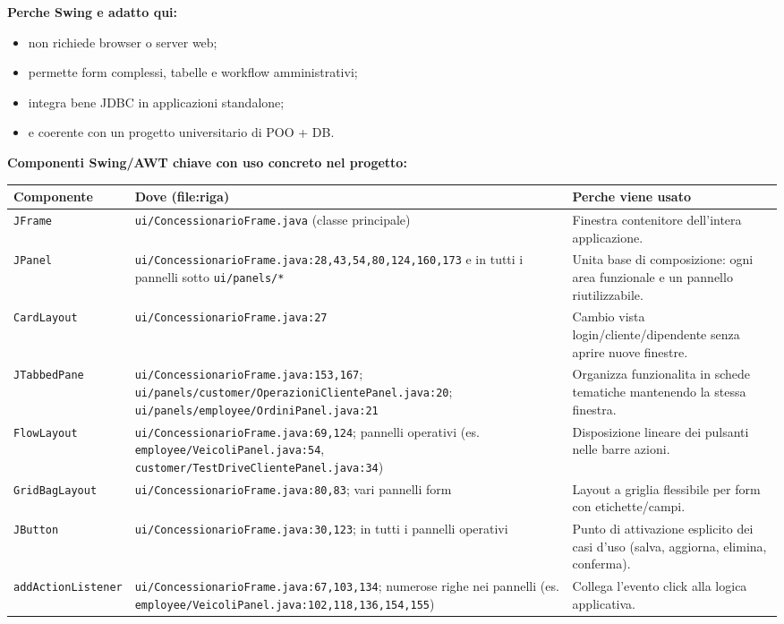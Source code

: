 \documentclass[12pt,a4paper]{article}
\begin{document}
\textbf{Perche Swing e adatto qui:}
\begin{itemize}
  \item non richiede browser o server web;
  \item permette form complessi, tabelle e workflow amministrativi;
  \item integra bene JDBC in applicazioni standalone;
  \item e coerente con un progetto universitario di POO + DB.
\end{itemize}

\textbf{Componenti Swing/AWT chiave con uso concreto nel progetto:}
\begin{longtable}{p{} p{} p{}}
\toprule
\textbf{Componente} & \textbf{Dove (file:riga)} & \textbf{Perche viene usato} \\
\midrule
\endhead
\texttt{JFrame} & \texttt{ui/ConcessionarioFrame.java} (classe principale) & Finestra contenitore dell'intera applicazione.
\\
\texttt{JPanel} & \texttt{ui/ConcessionarioFrame.java:28,43,54,80,124,160,173} e in tutti i pannelli sotto \texttt{ui/panels/*} & Unita base di composizione: ogni area funzionale e un pannello riutilizzabile.
\\
\texttt{CardLayout} & \texttt{ui/ConcessionarioFrame.java:27} & Cambio vista login/cliente/dipendente senza aprire nuove finestre.
\\
\texttt{JTabbedPane} & \texttt{ui/ConcessionarioFrame.java:153,167}; \texttt{ui/panels/customer/OperazioniClientePanel.java:20}; \texttt{ui/panels/employee/OrdiniPanel.java:21} & Organizza funzionalita in schede tematiche mantenendo la stessa finestra.
\\
\texttt{FlowLayout} & \texttt{ui/ConcessionarioFrame.java:69,124}; pannelli operativi (es. \texttt{employee/VeicoliPanel.java:54}, \texttt{customer/TestDriveClientePanel.java:34}) & Disposizione lineare dei pulsanti nelle barre azioni.
\\
\texttt{GridBagLayout} & \texttt{ui/ConcessionarioFrame.java:80,83}; vari pannelli form & Layout a griglia flessibile per form con etichette/campi.
\\
\texttt{JButton} & \texttt{ui/ConcessionarioFrame.java:30,123}; in tutti i pannelli operativi & Punto di attivazione esplicito dei casi d'uso (salva, aggiorna, elimina, conferma).
\\
\texttt{addActionListener} & \texttt{ui/ConcessionarioFrame.java:67,103,134}; numerose righe nei pannelli (es. \texttt{employee/VeicoliPanel.java:102,118,136,154,155}) & Collega l'evento click alla logica applicativa.
\\
\bottomrule
\end{longtable}
\end{document}
